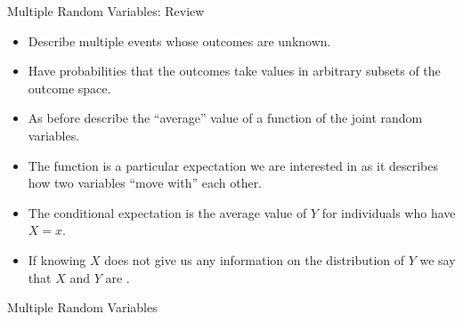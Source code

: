 \documentclass[notheorems,9pt]{beamer}
\begin{document}
\begin{frame}{Multiple Random Variables: Review} 
	\label{frame:mrv-review}

	\begin{itemize}
		\item Describe multiple events whose outcomes are unknown.
		\item Have probabilities that the outcomes  take values in arbitrary subsets of the  outcome space.
	\end{itemize}

	\begin{itemize}
		\item As before describe the ``average'' value of a function of the joint random variables.
		\item The  function is a particular expectation we are interested in as it describes how two variables ``move with'' each other.
	\end{itemize}
	
	\begin{itemize}
		\item The conditional expectation is the average value of \(Y\) for individuals who have \(X=x\).
		\item If knowing \(X\) does not give us any information on the distribution of \(Y\) we say that \(X\) and \(Y\) are .
	\end{itemize}
\end{frame}
\begin{frame}{Multiple Random Variables} 
	\centering{}	
\end{frame}
\end{document}
